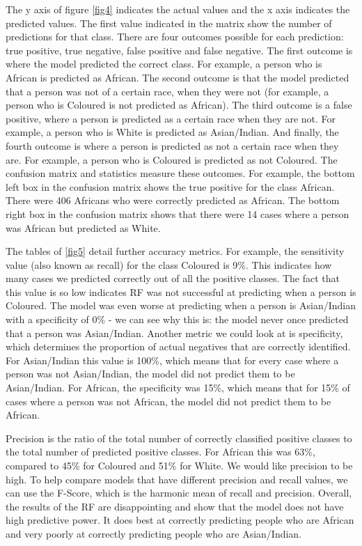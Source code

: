 \documentclass[11pt,preprint, authoryear]{elsarticle}
\numberwithin{equation}{section}
\numberwithin{figure}{section}
\numberwithin{table}{section}
\begin{document}
The y axis of figure \ref{fig4} indicates the actual values and the x
axis indicates the predicted values. The first value indicated in the
matrix show the number of predictions for that class. There are four
outcomes possible for each prediction: true positive, true negative,
false positive and false negative. The first outcome is where the model
predicted the correct class. For example, a person who is African is
predicted as African. The second outcome is that the model predicted
that a person was not of a certain race, when they were not (for
example, a person who is Coloured is not predicted as African). The
third outcome is a false positive, where a person is predicted as a
certain race when they are not. For example, a person who is White is
predicted as Asian/Indian. And finally, the fourth outcome is where a
person is predicted as not a certain race when they are. For example, a
person who is Coloured is predicted as not Coloured. The confusion
matrix and statistics measure these outcomes. For example, the bottom
left box in the confusion matrix shows the true positive for the class
African. There were 406 Africans who were correctly predicted as
African. The bottom right box in the confusion matrix shows that there
were 14 cases where a person was African but predicted as White.

The tables of \ref{fig5} detail further accuracy metrics. For example,
the sensitivity value (also known as recall) for the class Coloured is
9\%. This indicates how many cases we predicted correctly out of all the
positive classes. The fact that this value is so low indicates RF was
not successful at predicting when a person is Coloured. The model was
even worse at predicting when a person is Asian/Indian with a
specificity of 0\% - we can see why this is: the model never once
predicted that a person was Asian/Indian. Another metric we could look
at is specificity, which determines the proportion of actual negatives
that are correctly identified. For Asian/Indian this value is 100\%,
which means that for every case where a person was not Asian/Indian, the
model did not predict them to be Asian/Indian. For African, the
specificity was 15\%, which means that for 15\% of cases where a person
was not African, the model did not predict them to be African.

Precision is the ratio of the total number of correctly classified
positive classes to the total number of predicted positive classes. For
African this was 63\%, compared to 45\% for Coloured and 51\% for White.
We would like precision to be high. To help compare models that have
different precision and recall values, we can use the F-Score, which is
the harmonic mean of recall and precision. Overall, the results of the
RF are disappointing and show that the model does not have high
predictive power. It does best at correctly predicting people who are
African and very poorly at correctly predicting people who are
Asian/Indian.
\end{document}
